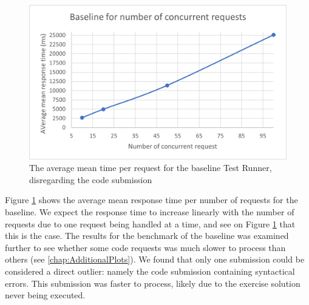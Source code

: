 \begin{figure}
  \centering
  \includegraphics[scale=0.80]{images/baseline.png}
  \caption{The average mean time per request for the baseline Test Runner, disregarding the code submission}
  \label{fig:baseline}
\end{figure}
Figure \ref{fig:baseline} shows the average mean response time per number of requests for the baseline.
We expect the response time to increase linearly with the number of requests due to one request being handled at a time, and see on Figure \ref{fig:baseline} that this is the case.
The results for the benchmark of the baseline was examined further to see whether some code requests was much slower to process than others (see \ref{chap:AdditionalPlots}). 
We found that only one submission could be considered a direct outlier: namely the code submission containing syntactical errors.
This submission was faster to process, likely due to the exercise solution never being executed.


